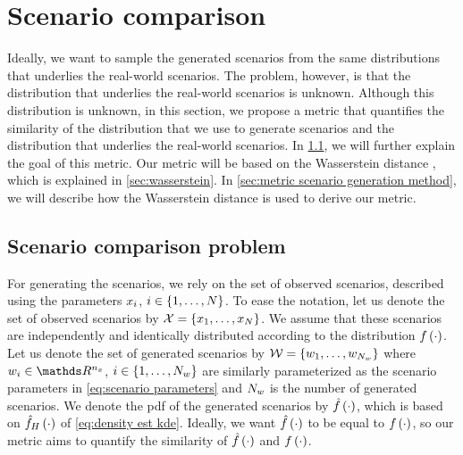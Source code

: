 \section{Scenario comparison}
\label{sec:comparison}

Ideally, we want to sample the generated scenarios from the same distributions that underlies the real-world scenarios. 
The problem, however, is that the distribution that underlies the real-world scenarios is unknown. 
Although this distribution is unknown, in this section, we propose a metric that quantifies the similarity of the distribution that we use to generate scenarios and the distribution that underlies the real-world scenarios.
In \cref{sec:comparion problem}, we will further explain the goal of this metric.
Our metric will be based on the Wasserstein distance \autocite{ruschendorf1985wasserstein}, which is explained in \cref{sec:wasserstein}.
In \cref{sec:metric scenario generation method}, we will describe how the Wasserstein distance is used to derive our metric.



\subsection{Scenario comparison problem}
\label{sec:comparion problem}

For generating the scenarios, we rely on the set of observed scenarios, described using the parameters $x_{i}$, $i \in \{1,\ldots,N\}$. 
To ease the notation, let us denote the set of observed scenarios by $\mathcal{X} = \{x_{1}, \ldots, x_{N}\}$.
We assume that these scenarios are independently and identically distributed according to the distribution $f\left( \cdot \right)$.
Let us denote the set of generated scenarios by $\mathcal{W} = \{w_{1}, \ldots, w_{N_w}\}$ where $\scenarioparsgenerated_{\scenarioindex} \in \realnumbers^{\dimensionscenariopars}$, $i \in \{1,\ldots,N_w\}$ are similarly parameterized as the scenario parameters in \cref{eq:scenario parameters} and $N_w$ is the number of generated scenarios.
We denote the \ac{pdf} of the generated scenarios by $\hat{f}\left( \cdot \right)$, which is based on $\hat{f}_{H}\left( \cdot \right)$ of \cref{eq:density est kde}.
Ideally, we want $\hat{f}\left( \cdot \right)$ to be equal to $f\left( \cdot \right)$, so our metric aims to quantify the similarity of $\hat{f}\left( \cdot \right)$ and $f\left( \cdot \right)$.

